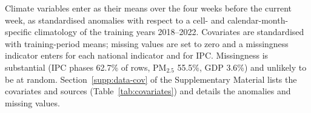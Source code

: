 Climate variables enter as their means over the four weeks before the current week,
as standardised anomalies with respect to a cell- and calendar-month-specific
climatology of the training years 2018--2022. Covariates are standardised with
training-period means; missing values are set to zero and a missingness indicator
enters for each national indicator and for IPC. Missingness is substantial (IPC phases
62.7\% of rows, PM$_{2.5}$ 55.5\%, GDP 3.6\%) and unlikely to be at random.
Section~\ref{supp:data-cov} of the Supplementary Material lists the covariates and
sources (Table~\ref{tab:covariates}) and details the anomalies and missing values.

